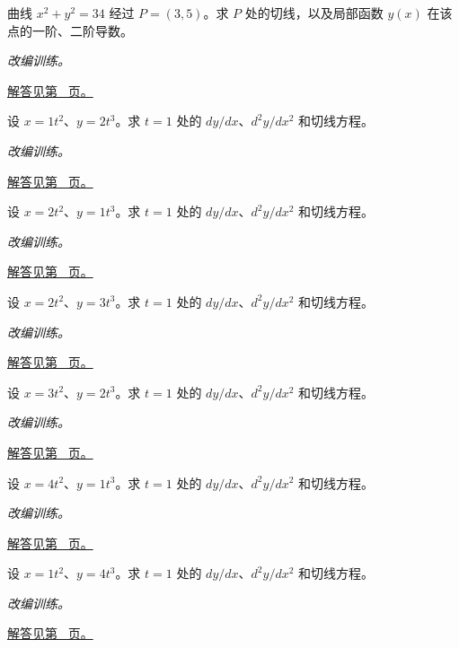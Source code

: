 \documentclass[12pt,fontset=fandol]{ctexart}
\begin{document}
\begin{example}[圆的隐函数导数]\label{ex:c9q6}
曲线 $x^2+y^2=34$ 经过 $P=(3,5)$。求 $P$ 处的切线，以及局部函数 $y(x)$ 在该点的一阶、二阶导数。
\par\textit{改编训练。}\par\hyperref[ans:c9q6]{解答见第~\pageref{ans:c9q6} 页。}
\end{example}
\begin{example}[幂参数曲线]\label{ex:c9q7}
设 $x=1t^2$、$y=2t^3$。求 $t=1$ 处的 $dy/dx$、$d^2y/dx^2$ 和切线方程。
\par\textit{改编训练。}\par\hyperref[ans:c9q7]{解答见第~\pageref{ans:c9q7} 页。}
\end{example}
\begin{example}[幂参数曲线]\label{ex:c9q8}
设 $x=2t^2$、$y=1t^3$。求 $t=1$ 处的 $dy/dx$、$d^2y/dx^2$ 和切线方程。
\par\textit{改编训练。}\par\hyperref[ans:c9q8]{解答见第~\pageref{ans:c9q8} 页。}
\end{example}
\begin{example}[幂参数曲线]\label{ex:c9q9}
设 $x=2t^2$、$y=3t^3$。求 $t=1$ 处的 $dy/dx$、$d^2y/dx^2$ 和切线方程。
\par\textit{改编训练。}\par\hyperref[ans:c9q9]{解答见第~\pageref{ans:c9q9} 页。}
\end{example}
\begin{example}[幂参数曲线]\label{ex:c9q10}
设 $x=3t^2$、$y=2t^3$。求 $t=1$ 处的 $dy/dx$、$d^2y/dx^2$ 和切线方程。
\par\textit{改编训练。}\par\hyperref[ans:c9q10]{解答见第~\pageref{ans:c9q10} 页。}
\end{example}
\begin{example}[幂参数曲线]\label{ex:c9q11}
设 $x=4t^2$、$y=1t^3$。求 $t=1$ 处的 $dy/dx$、$d^2y/dx^2$ 和切线方程。
\par\textit{改编训练。}\par\hyperref[ans:c9q11]{解答见第~\pageref{ans:c9q11} 页。}
\end{example}
\begin{example}[幂参数曲线]\label{ex:c9q12}
设 $x=1t^2$、$y=4t^3$。求 $t=1$ 处的 $dy/dx$、$d^2y/dx^2$ 和切线方程。
\par\textit{改编训练。}\par\hyperref[ans:c9q12]{解答见第~\pageref{ans:c9q12} 页。}
\end{example}
\end{document}
